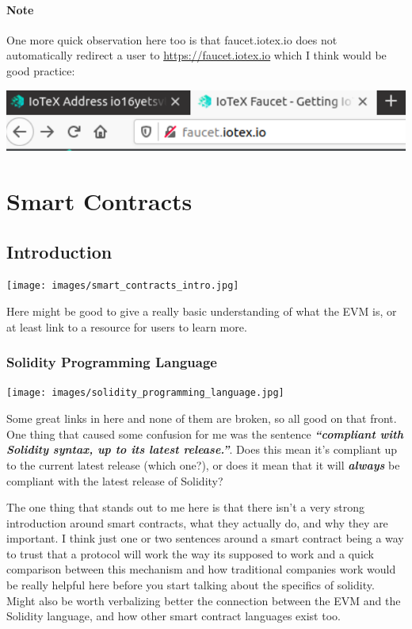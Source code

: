 \documentclass[
]{book}
\begin{document}
\hypertarget{note}{%
\subsubsection{Note}\label{note}}

One more quick observation here too is that faucet.iotex.io does not
automatically redirect a user to \url{https://faucet.iotex.io} which I
think would be good practice:

\includegraphics{images/unsecured_faucet.PNG}

\hypertarget{smart-contracts}{%
\chapter{Smart Contracts}\label{smart-contracts}}

\hypertarget{introduction-1}{%
\section{Introduction}\label{introduction-1}}

\texttt{[image: images/smart\_contracts\_intro.jpg]}

Here might be good to give a really basic understanding of what the EVM
is, or at least link to a resource for users to learn more.

\hypertarget{solidity-programming-language}{%
\subsection{Solidity Programming
Language}\label{solidity-programming-language}}

\texttt{[image: images/solidity\_programming\_language.jpg]}

Some great links in here and none of them are broken, so all good on
that front. One thing that caused some confusion for me was the sentence
\textbf{\emph{``compliant with Solidity syntax, up to its latest
release.''}}. Does this mean it's compliant up to the current latest
release (which one?), or does it mean that it will
\textbf{\emph{always}} be compliant with the latest release of Solidity?

The one thing that stands out to me here is that there isn't a very
strong introduction around smart contracts, what they actually do, and
why they are important. I think just one or two sentences around a smart
contract being a way to trust that a protocol will work the way its
supposed to work and a quick comparison between this mechanism and how
traditional companies work would be really helpful here before you start
talking about the specifics of solidity. Might also be worth verbalizing
better the connection between the EVM and the Solidity language, and how
other smart contract languages exist too.
\end{document}

